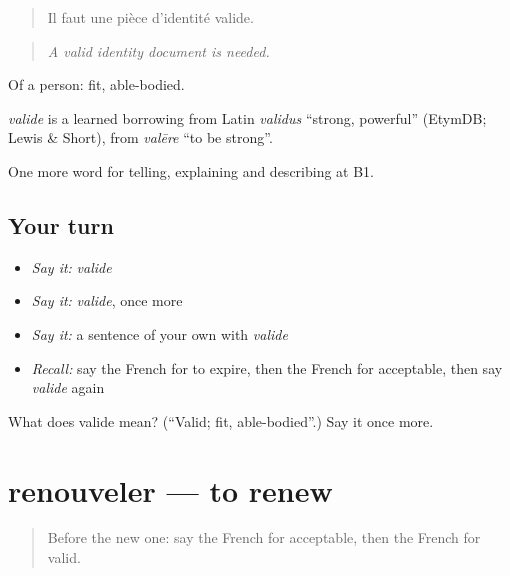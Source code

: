 \begin{quote}
Il faut une pièce d'identité valide.
\end{quote}

\begin{quote}
\emph{A valid identity document is needed.}
\end{quote}

Of a person: fit, able-bodied.

\begin{cousinweb}
\emph{valide} is a learned borrowing from Latin \emph{validus} \textquotedblleft{}strong, powerful\textquotedblright{} (EtymDB; Lewis \& Short), from \emph{valēre} \textquotedblleft{}to be strong\textquotedblright{}.
\end{cousinweb}

\begin{grammarlens}[title={What you've built}]
One more word for telling, explaining and describing at B1.
\end{grammarlens}

\subsection*{Your turn}
\begin{itemize}
\raggedright
  \item \emph{Say it:} \emph{valide}
  \item \emph{Say it:} \emph{valide}, once more
  \item \emph{Say it:} a sentence of your own with \emph{valide}
  \item \emph{Recall:} say the French for to expire, then the French for acceptable, then say \emph{valide} again
\end{itemize}

\begin{tcolorbox}[breakable,colback=teal!4,colframe=teal!35!black,title={Before you move on}]
What does valide mean? (\textquotedblleft{}Valid; fit, able-bodied\textquotedblright{}.) Say it once more.
\end{tcolorbox}
\section[renouveler]{renouveler — to renew}

\label{lesson:FR-C384-renouveler}



\begin{quote}
Before the new one: say the French for acceptable, then the French for valid.
\end{quote}

